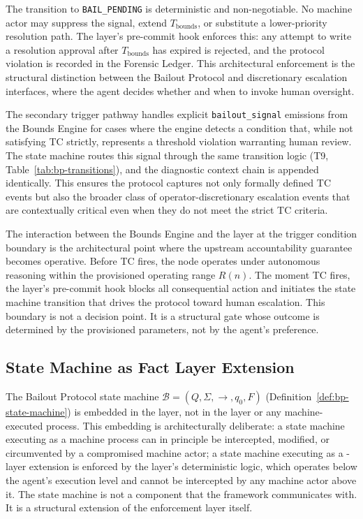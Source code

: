 The transition to \texttt{BAIL\_PENDING} is deterministic and non-negotiable.
No machine actor may suppress the signal, extend $T_{\text{bounds}}$, or
substitute a lower-priority resolution path.  The \fact{} layer's pre-commit
hook enforces this: any attempt to write a resolution approval after
$T_{\text{bounds}}$ has expired is rejected, and the protocol violation is
recorded in the Forensic Ledger.  This architectural enforcement is the
structural distinction between the Bailout Protocol and discretionary
escalation interfaces, where the agent decides whether and when to invoke
human oversight.

The secondary trigger pathway handles explicit \texttt{bailout\_signal}
emissions from the Bounds Engine for cases where the engine detects a
condition that, while not satisfying TC strictly, represents a threshold
violation warranting human review.  The state machine routes this signal
through the same transition logic (T9, Table~\ref{tab:bp-transitions}), and
the diagnostic context chain is appended identically.  This ensures the
protocol captures not only formally defined TC events but also the broader
class of operator-discretionary escalation events that are contextually
critical even when they do not meet the strict TC criteria.

The interaction between the Bounds Engine and the \fact{} layer at the
trigger condition boundary is the architectural point where the upstream
accountability guarantee becomes operative.  Before TC fires, the node
operates under autonomous reasoning within the provisioned operating range
$R(n)$.  The moment TC fires, the \fact{} layer's pre-commit hook blocks all
consequential action and initiates the state machine transition that drives the
protocol toward human escalation.  This boundary is not a decision point.
It is a structural gate whose outcome is determined by the provisioned
parameters, not by the agent's preference.

\subsection{State Machine as Fact Layer Extension}
\label{sec:bailout-state-machine}

The Bailout Protocol state machine
$\mathcal{B} = (Q, \Sigma, \rightarrow, q_0, F)$ (Definition~\ref{def:bp-state-machine})
is embedded in the \fact{} layer, not in the \bounds{} layer or any
machine-executed process.  This embedding is architecturally deliberate: a
state machine executing as a machine process can in principle be intercepted,
modified, or circumvented by a compromised machine actor; a state machine
executing as a \fact{}-layer extension is enforced by the layer's
deterministic logic, which operates below the agent's execution level and
cannot be intercepted by any machine actor above it.  The state machine is not
a component that the framework communicates with.  It is a structural
extension of the enforcement layer itself.

